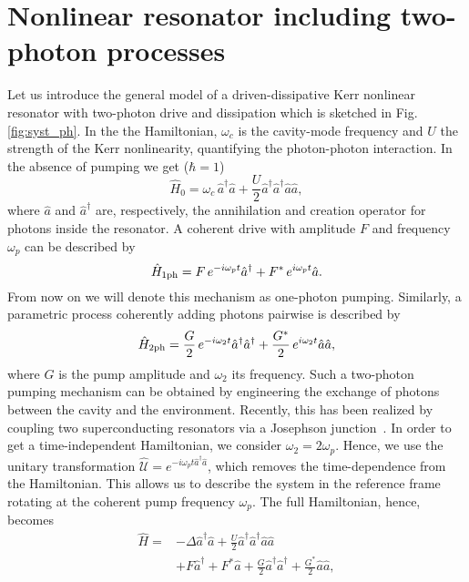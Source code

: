 \section{Nonlinear resonator including two-photon processes}\label{Sec:System}
Let us introduce the general model of a driven-dissipative Kerr nonlinear resonator with two-photon drive and dissipation which is sketched in Fig. \ref{fig:syst_ph}. In the the Hamiltonian, $\omega_c$ is the cavity-mode frequency and $U$ the strength of the Kerr nonlinearity, quantifying the photon-photon interaction.
In the absence of pumping we get ($\hbar=1$)
\begin{equation}
\hat{H}_0=\omega_c\,{\hat{a}^\dagger}{\hat{a}}+\frac{U}{2}{\hat{a}^\dagger}{\hat{a}^\dagger}{\hat{a}}{\hat{a}},
\end{equation}
where $\hat{a}$ and $\hat{a}^\dagger$ are, respectively, the annihilation and creation operator for photons inside the resonator.
A coherent drive with amplitude $F$ and frequency $\omega_p$ can be described by
\begin{equation}\label{Eq:H1ph}
\hat{H}_{\rm1ph}=F\,e^{- i  \omega_p t}{\hat{a}^\dagger}+F^*\,e^{ i  \omega_p t}{\hat{a}}.
\end{equation}
From now on we will denote this mechanism as one-photon pumping.
Similarly, a parametric process coherently adding photons pairwise is described by
\begin{equation}\label{Eq:H2ph}
\hat{H}_{\rm2ph}=\frac{G}{2}\,e^{-i \omega_2t}{\hat{a}^\dagger}{\hat{a}^\dagger}+\frac{G^*}{2}\,e^{i \omega_2t}{\hat{a}}{\hat{a}},
\end{equation}
where $G$ is the pump amplitude and $\omega_2$ its frequency.
Such a two-photon pumping mechanism can be obtained by engineering the exchange of photons between the cavity and the environment.
Recently, this has been realized by coupling two superconducting resonators via a Josephson junction~\cite{LeghtasScience15}.
In order to get a time-independent Hamiltonian, we consider $\omega_2=2\omega_p$.
Hence, we use the unitary transformation $\hat{\mathcal{U}}=e^{- i \omega_pt{\hat{a}^\dagger}{\hat{a}}}$, which removes the time-dependence from the Hamiltonian.
This allows us to describe the system in the reference frame rotating at the coherent pump frequency $\omega_p$.
The full Hamiltonian, hence, becomes
\begin{align}\label{Eq:HCompleteOur}
\hat{H}=&-\Delta{\hat{a}^\dagger}{\hat{a}}+\frac{U}{2}{\hat{a}^\dagger}{\hat{a}^\dagger}{\hat{a}}{\hat{a}}
\nonumber\\
&+F{\hat{a}^\dagger}+F^*{\hat{a}}+\frac{G}{2}{\hat{a}^\dagger}{\hat{a}^\dagger}+\frac{G^*}{2}{\hat{a}}{\hat{a}},
\end{align}
